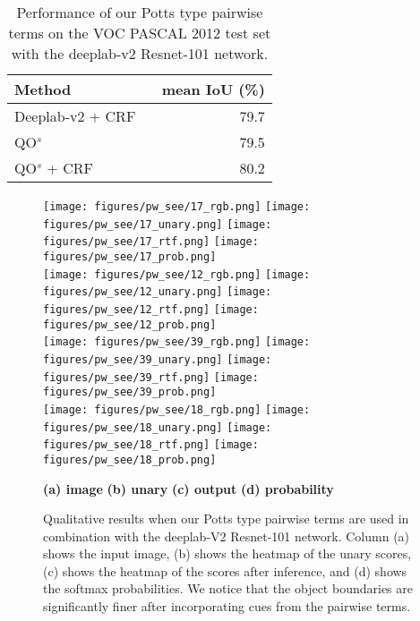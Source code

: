 \documentclass[runningheads]{llncs}
\begin{document}
 \begin{table}[tbh]
\centering
 \begin{tabular}{l|r}
 \hline
 Method & mean IoU (\%) \\ \hline
Deeplab-v2 + CRF ~\cite{deeplabv2} & 79.7 \\ \hline
QO$^s$ & 79.5 \\ \hline
QO$^s$ + CRF & 80.2 \\ \hline
\end{tabular}
  \vspace{2mm}
\caption{Performance of our Potts type pairwise terms on the VOC PASCAL 2012 test set with the deeplab-v2 Resnet-101 network.}
\label{table:resnet}
\end{table}

\begin{figure*}[tbh]
\begin{center}
\texttt{[image: figures/pw\_see/17\_rgb.png]}
\texttt{[image: figures/pw\_see/17\_unary.png]}
\texttt{[image: figures/pw\_see/17\_rtf.png]}
\texttt{[image: figures/pw\_see/17\_prob.png]}\\
\texttt{[image: figures/pw\_see/12\_rgb.png]}
\texttt{[image: figures/pw\_see/12\_unary.png]}
\texttt{[image: figures/pw\_see/12\_rtf.png]}
\texttt{[image: figures/pw\_see/12\_prob.png]}\\
\texttt{[image: figures/pw\_see/39\_rgb.png]}
\texttt{[image: figures/pw\_see/39\_unary.png]}
\texttt{[image: figures/pw\_see/39\_rtf.png]}
\texttt{[image: figures/pw\_see/39\_prob.png]}\\
\texttt{[image: figures/pw\_see/18\_rgb.png]}
\texttt{[image: figures/pw\_see/18\_unary.png]}
\texttt{[image: figures/pw\_see/18\_rtf.png]}
\texttt{[image: figures/pw\_see/18\_prob.png]}\\
\end{center}
\hspace{5mm} \textbf{(a) image} \hspace{15mm} \textbf{(b) unary} \hspace{15mm} \textbf{(c) output} \hspace{15mm} \textbf{(d) probability}\\
\caption{Qualitative results when our Potts type pairwise terms are used in combination with the deeplab-V2 Resnet-101 network. Column (a) shows the input image,
(b) shows the heatmap of the unary scores, (c) shows the heatmap of the scores after inference, and (d) shows the softmax probabilities. We notice that the object
boundaries are significantly finer after incorporating cues from the pairwise terms.}
\label{fig:visualresnet}
\end{figure*}
\end{document}
